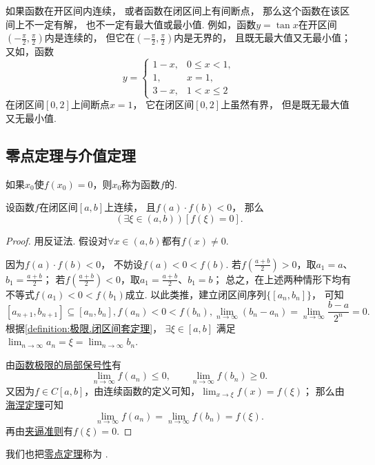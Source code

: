 如果函数在开区间内连续，
或者函数在闭区间上有间断点，
那么这个函数在该区间上不一定有解，
也不一定有最大值或最小值.
例如，函数\(y=\tan x\)在开区间\(\left(-\frac{\pi}{2},\frac{\pi}{2}\right)\)内是连续的，
但它在\(\left(-\frac{\pi}{2},\frac{\pi}{2}\right)\)内是无界的，
且既无最大值又无最小值；
又如，函数\[
	y=\left\{ \begin{array}{ll}
		1-x, & 0\leq x<1, \\
		1, & x=1, \\
		3-x, & 1<x\leq2
	\end{array} \right.
\]在闭区间\([0,2]\)上间断点\(x=1\)，
它在闭区间\([0,2]\)上虽然有界，
但是既无最大值又无最小值.

\subsection{零点定理与介值定理}
\begin{definition}
如果\(x_0\)使\(f(x_0) = 0\)，则\(x_0\)称为函数\(f\)的.
\end{definition}

\begin{theorem}[零点定理]\label{theorem:极限.零点定理}
设函数\(f\)在闭区间\([a,b]\)上连续，
且\(f(a) \cdot f(b)<0\)，
那么\[
	(\exists\xi\in(a,b))[f(\xi) = 0].
\]
\begin{proof}
用反证法.
假设对\(\forall x\in(a,b)\)都有\(f(x) \neq 0\).

因为\(f(a) \cdot f(b)<0\)，
不妨设\(f(a) < 0 < f(b)\).
若\(f\left(\frac{a+b}{2}\right)>0\)，取\(a_1=a\)、\(b_1=\frac{a+b}{2}\)；
若\(f\left(\frac{a+b}{2}\right)<0\)，取\(a_1=\frac{a+b}{2}\)、\(b_1=b\)；
总之，在上述两种情形下均有不等式\(f(a_1) < 0 < f(b_1)\)成立.
以此类推，建立闭区间序列\(\{[a_n,b_n]\}\)，
可知\[
	[a_{n+1},b_{n+1}] \subseteq [a_n,b_n],
	f(a_n) < 0 < f(b_n),
	\lim_{n\to\infty} (b_n - a_n)
	= \lim_{n\to\infty} \frac{b-a}{2^n}
	= 0.
\]
根据\cref{definition:极限.闭区间套定理}，
\(\exists\xi\in[a,b]\)
满足\(\lim_{n\to\infty} a_n
= \xi
= \lim_{n\to\infty} b_n\).

由\hyperref[theorem:极限.函数极限的局部保号性3]{函数极限的局部保号性}有\[
	\lim_{n\to\infty} f(a_n) \leq 0,
	\qquad
	\lim_{n\to\infty} f(b_n) \geq 0.
\]
又因为\(f \in C[a,b]\)，由连续函数的定义可知，\(\lim_{x\to\xi} f(x) = f(\xi)\)；
那么由\hyperref[theorem:极限.海涅定理]{海涅定理}可知\[
	\lim_{n\to\infty} f(a_n)
	= \lim_{n\to\infty} f(b_n)
	= f(\xi).
\]
再由\hyperref[theorem:函数极限.夹逼准则]{夹逼准则}有\(f(\xi)=0\).
\end{proof}
\end{theorem}
我们也把\hyperref[theorem:极限.零点定理]{零点定理}称为%
.

